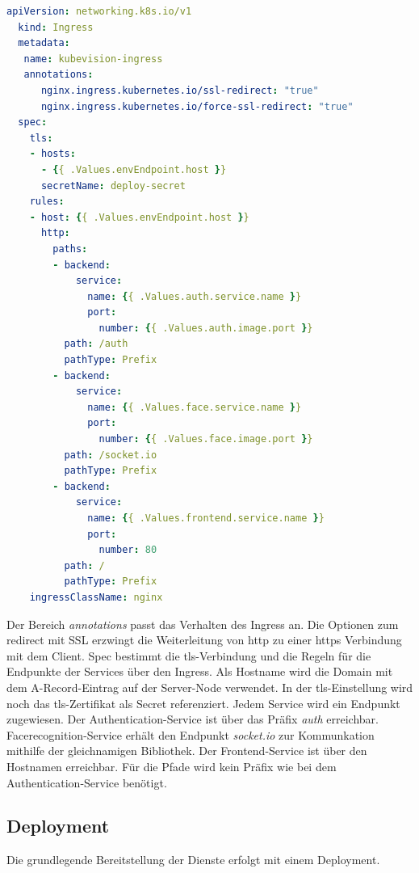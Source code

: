 \begin{lstlisting}[caption={kubevision-ingress.yaml},captionpos=b,label={lst:kubevisioningress},language=yaml,float,floatplacement=H]
  apiVersion: networking.k8s.io/v1
  kind: Ingress
  metadata:
   name: kubevision-ingress
   annotations:
      nginx.ingress.kubernetes.io/ssl-redirect: "true"
      nginx.ingress.kubernetes.io/force-ssl-redirect: "true"
  spec:
    tls:
    - hosts:
      - {{ .Values.envEndpoint.host }}
      secretName: deploy-secret
    rules:
    - host: {{ .Values.envEndpoint.host }}
      http:
        paths:
        - backend:
            service:
              name: {{ .Values.auth.service.name }}
              port:
                number: {{ .Values.auth.image.port }}
          path: /auth
          pathType: Prefix
        - backend:
            service:
              name: {{ .Values.face.service.name }}
              port:
                number: {{ .Values.face.image.port }}
          path: /socket.io
          pathType: Prefix
        - backend:
            service:
              name: {{ .Values.frontend.service.name }}
              port:
                number: 80
          path: /
          pathType: Prefix
    ingressClassName: nginx

\end{lstlisting}

Der Bereich \textit{annotations} passt das Verhalten des Ingress an.
Die Optionen zum redirect mit SSL erzwingt die Weiterleitung von \acs{http} zu einer \acs{https} Verbindung mit dem Client.
Spec bestimmt die \acs{tls}-Verbindung und die Regeln für die Endpunkte der Services über den Ingress.
Als Hostname wird die Domain mit dem A-Record-Eintrag auf der Server-Node verwendet.
In der \acs{tls}-Einstellung wird noch das \acs{tls}-Zertifikat als Secret referenziert.
Jedem Service wird ein Endpunkt zugewiesen.
Der Authentication-Service ist über das Präfix \textit{auth} erreichbar.
Facerecognition-Service erhält den Endpunkt \textit{socket.io} zur Kommunkation mithilfe der gleichnamigen Bibliothek.
Der Frontend-Service ist über den Hostnamen erreichbar.
Für die Pfade wird kein Präfix wie bei dem Authentication-Service benötigt.



\subsection{Deployment}

Die grundlegende Bereitstellung der Dienste erfolgt mit einem Deployment.

